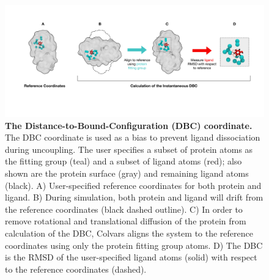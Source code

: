 \documentclass[9pt,tutorial]{Styling/livecoms}
\begin{document}

\onecolumn
\begin{figure}[h]
    \centering
    \includegraphics[width=\textwidth]{DBCfigfinal.pdf}
    \caption{\textbf{The Distance-to-Bound-Configuration (DBC) coordinate.} The DBC coordinate is used as a bias to prevent ligand dissociation during uncoupling. The user specifies a subset of protein atoms as the fitting group (teal) and a subset of ligand atoms (red); also shown are the protein surface (gray) and remaining ligand atoms (black). A) User-specified reference coordinates for both protein and ligand.    %
    B) During simulation, both protein and ligand will drift from the reference coordinates (black dashed outline).   
    C) In order to remove rotational and translational diffusion of the protein from calculation of the DBC, Colvars aligns the system to the reference coordinates using only the protein fitting group atoms. 
    D) The DBC is the RMSD of the user-specified ligand atoms (solid) with respect to the reference coordinates (dashed).}
    \label{fig:DBC}
\end{figure}
\end{document}
